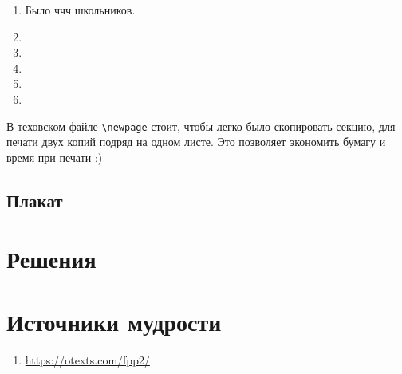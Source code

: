 \documentclass[12pt]{article}
\newcounter{problem}[section]
\theoremstyle{definition}
\begin{document}
\begin{enumerate}
  \item Было ччч школьников. 
  \item 
  \item 
  \item 
  \item 
  \item 
\end{enumerate}

В теховском файле \verb|\newpage| стоит, чтобы легко было скопировать секцию, для печати двух копий подряд на одном листе.
Это позволяет экономить бумагу и время при печати :)

\subsection{Плакат}






\renewenvironment{solution}[1]{%
         \vskip .5cm plus 2cm minus 0.1cm%
         {\bfseries \hyperlink{problem:#1}{#1.}}%
}%
{%
}%



\section{Решения}



\section{Источники мудрости}


\begin{enumerate}
\item \url{https://otexts.com/fpp2/}
\end{enumerate}

\printbibliography[heading=none]
\end{document}
